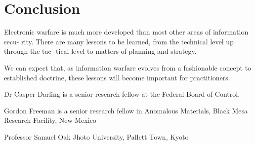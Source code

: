 \documentclass[10pt,journal,compsoc]{IEEEtran}
\begin{document}
\section{Conclusion}

Electronic warfare is much more developed than most other areas of information secu-
rity. There are many lessons to be learned, from the technical level up through the tac-
tical level to matters of planning and strategy.

We can expect that, as information
warfare evolves from a fashionable concept to established doctrine, these lessons will
become important for practitioners.


%


\appendices


\begin{IEEEbiography}{Dr Casper Darling}
is a senior research fellow at the Federal Board of Control.
\end{IEEEbiography}

\begin{IEEEbiography}{Gordon Freeman}
    is a senior research fellow in Anomalous Materials, Black Mesa Research Facility, New Mexico
\end{IEEEbiography}

\begin{IEEEbiography}{Professor Samuel Oak}
    Jhoto University, Pallett Town, Kyoto
\end{IEEEbiography}

\end{document}
